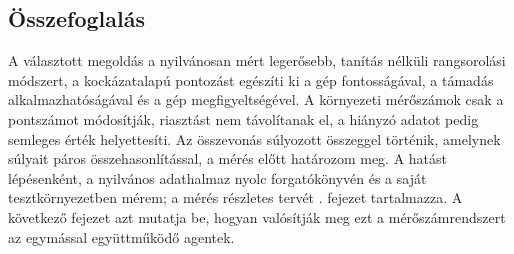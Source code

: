 \subsection{Összefoglalás}
A választott megoldás a nyilvánosan mért legerősebb, tanítás nélküli rangsorolási módszert, a kockázatalapú pontozást egészíti ki a gép fontosságával, a támadás alkalmazhatóságával és a gép megfigyeltségével. A környezeti mérőszámok csak a pontszámot módosítják, riasztást nem távolítanak el, a hiányzó adatot pedig semleges érték helyettesíti. Az összevonás súlyozott összeggel történik, amelynek súlyait páros összehasonlítással, a mérés előtt határozom meg. A hatást lépésenként, a nyilvános adathalmaz nyolc forgatókönyvén és a saját tesztkörnyezetben mérem; a mérés részletes tervét \az{\ref{sec:ertekeles}}. fejezet tartalmazza. A következő fejezet azt mutatja be, hogyan valósítják meg ezt a mérőszámrendszert az egymással együttműködő agentek.